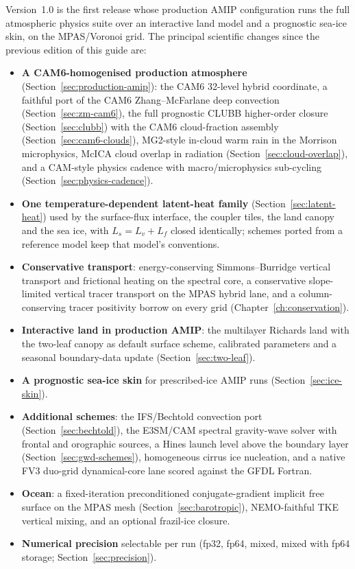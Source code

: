 \documentclass[11pt,twoside]{report}
\newcommand{\Lv}{L_v}
\newcommand{\Ls}{L_s}
\newcommand{\Lf}{L_f}
\begin{document}
Version~1.0 is the first release whose production AMIP configuration runs the
full atmospheric physics suite over an interactive land model and a prognostic
sea-ice skin, on the MPAS/Voronoi grid.  The principal scientific changes since the previous edition of this guide are:
\begin{itemize}[nosep]
  \item \textbf{A CAM6-homogenised production atmosphere}
    (Section~\ref{sec:production-amip}): the CAM6 32-level hybrid
    coordinate, a faithful port of the CAM6 Zhang--McFarlane deep convection
    (Section~\ref{sec:zm-cam6}), the full prognostic CLUBB higher-order
    closure (Section~\ref{sec:clubb}) with the CAM6 cloud-fraction assembly
    (Section~\ref{sec:cam6-clouds}), MG2-style in-cloud warm rain in the
    Morrison microphysics, McICA cloud overlap in radiation
    (Section~\ref{sec:cloud-overlap}), and a CAM-style physics cadence with
    macro/microphysics sub-cycling (Section~\ref{sec:physics-cadence}).
  \item \textbf{One temperature-dependent latent-heat family}
    (Section~\ref{sec:latent-heat}) used by the surface-flux interface,
    the coupler tiles, the land canopy and the sea ice, with $\Ls=\Lv+\Lf$
    closed identically; schemes ported from a reference model keep that
    model's conventions.
  \item \textbf{Conservative transport}: energy-conserving
    Simmons--Burridge vertical transport and frictional heating on the
    spectral core, a conservative slope-limited vertical tracer transport
    on the MPAS hybrid lane, and a column-conserving tracer positivity
    borrow on every grid (Chapter~\ref{ch:conservation}).
  \item \textbf{Interactive land in production AMIP}: the multilayer
    Richards land with the two-leaf canopy as default surface scheme,
    calibrated parameters and a seasonal boundary-data update
    (Section~\ref{sec:two-leaf}).
  \item \textbf{A prognostic sea-ice skin} for prescribed-ice AMIP runs
    (Section~\ref{sec:ice-skin}).
  \item \textbf{Additional schemes}: the IFS/Bechtold convection port
    (Section~\ref{sec:bechtold}), the E3SM/CAM spectral gravity-wave
    solver with frontal and orographic sources, a Hines launch level above the
    boundary layer (Section~\ref{sec:gwd-schemes}), homogeneous cirrus ice nucleation, and a
    native FV3 duo-grid dynamical-core lane scored against the GFDL Fortran.
  \item \textbf{Ocean}: a fixed-iteration preconditioned conjugate-gradient
    implicit free surface on the MPAS mesh (Section~\ref{sec:barotropic}),
    NEMO-faithful TKE vertical mixing, and an optional frazil-ice closure.
  \item \textbf{Numerical precision} selectable per run (fp32, fp64,
    mixed, mixed with fp64 storage; Section~\ref{sec:precision}).
\end{itemize}
\end{document}
